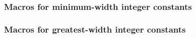 \def\Subsubsection#1{\subsubsection{#1}}

\Subsubsection{Macros for minimum-width integer constants}

\Subsubsection{Macros for greatest-width integer constants}
